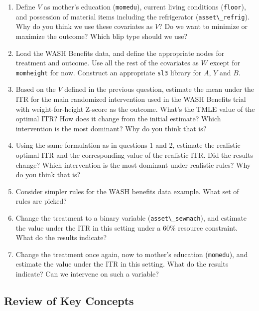 \documentclass[12pt, krantz2,]{krantz}
\newcommand{\passthrough}[1]{#1}
\theoremstyle{definition}
\theoremstyle{definition}
\theoremstyle{definition}
\newcommand{\1}{\mathbbm{1}}
\begin{document}
\begin{enumerate}
\def\labelenumi{\arabic{enumi}.}
\item
  Define \(V\) as mother's education (\passthrough{\lstinline!momedu!}), current living conditions (\passthrough{\lstinline!floor!}),
  and possession of material items including the refrigerator (\passthrough{\lstinline!asset\_refrig!}).
  Why do you think we use these covariates as \(V\)? Do we want to minimize or
  maximize the outcome? Which blip type should we use?
\item
  Load the WASH Benefits data, and define the appropriate nodes for treatment
  and outcome. Use all the rest of the covariates as \(W\) except for
  \passthrough{\lstinline!momheight!} for now. Construct an appropriate \passthrough{\lstinline!sl3!} library for \(A\), \(Y\) and
  \(B\).
\item
  Based on the \(V\) defined in the previous question, estimate the mean under
  the ITR for the main randomized intervention used in the WASH Benefits trial
  with weight-for-height Z-score as the outcome. What's the TMLE value of the
  optimal ITR? How does it change from the initial estimate? Which
  intervention is the most dominant? Why do you think that is?
\item
  Using the same formulation as in questions 1 and 2, estimate the realistic
  optimal ITR and the corresponding value of the realistic ITR. Did the results
  change? Which intervention is the most dominant under realistic rules? Why do
  you think that is?
\item
  Consider simpler rules for the WASH benefits data example. What set of rules
  are picked?
\item
  Change the treatment to a binary variable (\passthrough{\lstinline!asset\_sewmach!}), and estimate the
  value under the ITR in this setting under a \(60\%\) resource constraint. What
  do the results indicate?
\item
  Change the treatment once again, now to mother's education (\passthrough{\lstinline!momedu!}), and
  estimate the value under the ITR in this setting. What do the results
  indicate? Can we intervene on such a variable?
\end{enumerate}

\hypertarget{review-of-key-concepts-1}{%
\subsection{Review of Key Concepts}\label{review-of-key-concepts-1}}
\end{document}
